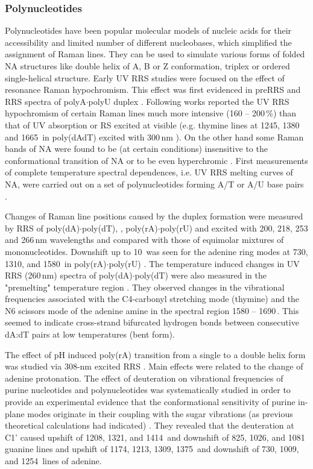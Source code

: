 \subsubsection{Polynucleotides}

Polynucleotides have been popular molecular models of nucleic acids for their
accessibility and limited number of different nucleobases, which simplified the
assignment of Raman lines.
They can be used to simulate various forms of folded NA structures like double
helix of A, B or Z conformation, triplex or ordered single-helical structure.
Early UV RRS studies were focused on the effect of resonance Raman
hypochromism.
This effect was first evidenced in preRRS and RRS spectra of polyA$\cdot$polyU
duplex
\parencite{Pezolet1975}.
Following works reported the UV RRS hypochromism of certain Raman lines much
more intensive (160 -- 200\,\%) than that of UV absorption or RS excited at
visible (e.g. thymine lines at 1245, 1380 and 1665\,\icm{} in poly(dAdT)
excited with 300\,nm
\cite{Chinsky1982a}).
On the other hand some Raman bands of NA were found to be (at certain
conditions) insensitive to the conformational transition of NA or to be even
hyperchromic
\parencite{Chinsky1980}.
First measurements of complete temperature spectral dependences, i.e. UV RRS
melting curves of NA, were carried out on a set of polynucleotides forming A/T
or A/U base pairs
\parencite{Jolles1985}.

Changes of Raman line positions caused by the duplex formation were measured by
RRS of
	poly(dA)$\cdot$poly(dT),
	,
	poly(rA)$\cdot$poly(rU)
	and 
excited with 200, 218, 253 and 266\,nm wavelengths and compared with those of
equimolar mixtures of mononucleotides.
Downshift up to 10\,\icm{} was seen for the adenine ring modes at 730, 1310,
and 1580\,\icm{} in poly(rA)$\cdot$poly(rU)
\parencite{Grygon1990}.
The temperature induced changes in UV RRS (260\,nm) spectra of
poly(dA)$\cdot$poly(dT) were also measured in the "premelting" temperature
region
\parencite{Chan1997}.
They observed changes in the vibrational frequencies associated with the
C4-carbonyl stretching mode (thymine) and the N6 scissors mode of the adenine
amine in the spectral region 1580 -- 1690\,\icm{}.
This seemed to indicate cross-strand bifurcated hydrogen bonds between
consecutive dA:dT pairs at low temperatures (bent form).

The effect of pH induced poly(rA) transition from a single to a double helix
form was studied via 308-nm excited RRS
\parencite{Gfrorer1989}.
Main effects were related to the change of adenine protonation.
The effect of deuteration on vibrational frequencies of purine nucleotides and
polynucleotides was systematically studied in order to provide an experimental
evidence that the conformational sensitivity of purine in-plane modes originate
in their coupling with the sugar vibrations (as previous theoretical
calculations had indicated)
\parencite{Toyama1993}.
They revealed that the deuteration at C1' caused upshift of 1208, 1321, and
1414\,\icm{} and downshift of 825, 1026, and 1081\,\icm{} guanine lines and
upshift of 1174, 1213, 1309, 1375\,\icm{} and downshift of 730, 1009, and
1254\,\icm{} lines of adenine.

